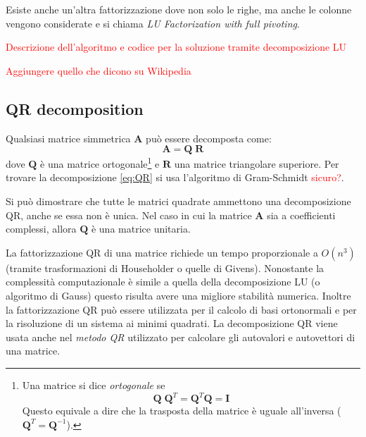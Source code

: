\documentclass[10pt]{article}
\begin{document}
Esiste anche un'altra fattorizzazione dove non solo le righe, ma anche le colonne vengono considerate e si chiama \emph{LU Factorization with full pivoting}.

\textcolor{red}{Descrizione dell'algoritmo e codice per la soluzione tramite decomposizione LU}

\textcolor{red}{Aggiungere quello che dicono su Wikipedia}

\subsection{QR decomposition}

Qualsiasi matrice simmetrica $\mathbf{A}$ può essere decomposta come:
\begin{equation}
\mathbf{A} = \mathbf{Q} \; \mathbf{R}
\label{eq:QR}
\end{equation}
dove $\mathbf{Q}$ è una matrice ortogonale\footnote{Una matrice si dice \emph{ortogonale} se
\begin{equation}
\mathbf{Q}\;\mathbf{Q}^T = \mathbf{Q}^T\mathbf{Q} = \mathbf{I}
\end{equation}
Questo equivale a dire che la trasposta della matrice è uguale all'inversa ($\mathbf{Q}^T=\mathbf{Q}^{-1}$).} e $\mathbf{R}$ una matrice triangolare superiore.
Per trovare la decomposizione \eqref{eq:QR} si usa l'algoritmo di Gram-Schmidt \textcolor{red}{sicuro?}.

Si può dimostrare che tutte le matrici quadrate ammettono una decomposizione QR, anche se essa non è unica. Nel caso in cui la matrice $\mathbf{A}$ sia a coefficienti complessi, allora $\mathbf{Q}$ è una matrice unitaria.

La fattorizzazione QR di una matrice richiede un tempo proporzionale a $O(n^3)$ (tramite trasformazioni di Householder o quelle di Givens). Nonostante la complessità computazionale è simile a quella della decomposizione LU (o algoritmo di Gauss) questo risulta avere una migliore stabilità numerica.
Inoltre la fattorizzazione QR può essere utilizzata per il calcolo di basi ortonormali e per la risoluzione di un sistema ai minimi quadrati. La decomposizione QR viene usata anche nel \textit{metodo QR} utilizzato per calcolare gli autovalori e autovettori di una matrice.
\end{document}
